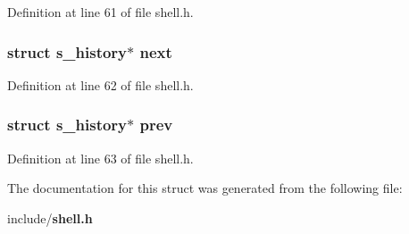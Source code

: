 Definition at line 61 of file shell.\-h.

\subsubsection[{next}]{\setlength{\rightskip}{0pt plus 5cm}struct {\bf s\-\_\-history}$\ast$ next}\label{structs__history_a5d4e20503141c1617cd3ef296ea66d0e}


Definition at line 62 of file shell.\-h.

\subsubsection[{prev}]{\setlength{\rightskip}{0pt plus 5cm}struct {\bf s\-\_\-history}$\ast$ prev}\label{structs__history_af7dadc2c1ca47fd86993081a65a8d9e8}


Definition at line 63 of file shell.\-h.



The documentation for this struct was generated from the following file\-:\begin{DoxyCompactItemize}
\item 
include/{\bf shell.\-h}\end{DoxyCompactItemize}
